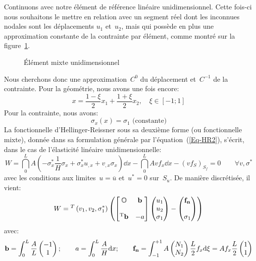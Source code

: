Continuons avec notre élément de référence linéaire unidimensionnel. Cette fois-ci nous souhaitons le mettre en relation avec un segment réel dont les inconnues nodales sont les déplacements $u_1$ et~$u_2$, mais qui possède en plus une approximation constante de la contrainte par élément, comme montré sur la figure~\ref{fig-ex2mixte}.
\begin{figure}[ht]\centering
{} \hspace{5 em}
\caption{Élément mixte unidimensionnel}\label{fig-ex2mixte}
\end{figure}
\medskipvm
Nous cherchons donc une approximation~$C^0$ du déplacement et~$C^{-1}$ de la
contrainte.
\medskipvm
Pour la géométrie, nous avons une fois encore:
\begin{equation} x=\frac{1-\xi}2 x_1 + \frac{1+\xi}2 x_2, \quad \xi\in[-1;1] \end{equation}
\medskipvm
Pour la contrainte, nous avons:
\begin{equation} \sigma_x(x)=\sigma_1 \text{ (constante)} \end{equation}
\medskipvm
La fonctionnelle d'Hellinger-Reissner sous sa deuxième forme (ou fonctionnelle mixte), donnée dans sa formulation générale par l'équation~(\ref{Eq-HR2}), s'écrit, dans le cas de l'élasticité linéaire unidimensionnelle:
\begin{equation}
W=\dint_0^L A\left(-\sigma_x^*\frac1H\sigma_x+\sigma_x^*u_{,x}+v_{,x}\sigma_x\right) \dd x
-\dint_0^L Avf_x \dd x - (v f_S)_{S_f} = 0\qquad \forall v,\sigma^*
\end{equation}
avec les conditions aux limites~$u=\overline{u}$ et~$u^*=0$ sur~$S_u$.
\medskipvm
De manière discrétisée, il vient:
\begin{equation}
W = \LLL{v_1, v_2, \sigma_1^*}\left(
\MM*{\mO & \VV{b}\\ ~\\ \LL{b} & -a}
\VV*{u_1\\u_2\\ \sigma_1}
- \VV*{\VV{f_n}\\~\\ \sigma_1}
\right)\end{equation}
avec:
\begin{equation}
\VV{b}=\dint_0^L \frac{A}L \VV*{-1\\1}; \qquad
a=\dint_0^L \frac{A}H \dd x; \qquad
\VV{f_n} = \dint_{-1}^{+1} A \VV*{N_1\\N_2} \frac{L}2 f_x \dd\xi =
 A f_x \frac{L}2 \VV*{1\\1}
\end{equation}
